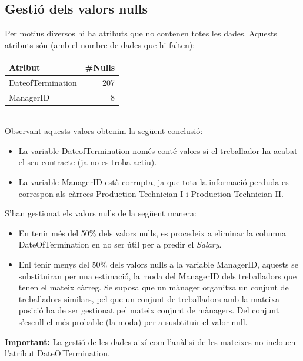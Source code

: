 \documentclass[a4paper, 11pt]{article}
\begin{document}
\subsection{Gestió dels valors nulls}
Per motius diversos hi ha atributs que no contenen totes les dades. Aquests atributs són (amb el nombre de dades que hi falten):
\begin{table}[h]
    \centering
    \begin{tabular}{l|r}
        \textbf{Atribut} & \textbf{\#Nulls}\\\hline\hline
        DateofTermination & 207  \\\hline
        ManagerID & 8 \\
    \end{tabular}
    \label{tab:my_label}
\end{table}\\
Observant aquests valors obtenim la següent conclusió:
\begin{itemize}
    \item La variable DateofTermination només conté valors si el treballador ha acabat el seu contracte (ja no es troba actiu).
    \item La variable ManagerID està corrupta, ja que tota la informació perduda es correspon als càrrecs Production Technician I i Production Technician II.
\end{itemize}
S'han gestionat els valors nulls de la següent manera:
\begin{itemize}
    \item En tenir més del 50\% dels valors nulls, es procedeix a eliminar la columna DateOfTermination en no ser útil per a predir el \textit{Salary}.
    \item Enl tenir menys del 50\% dels valors nulls a la variable ManagerID, aquests se substituiran per una estimació, la moda del ManagerID dels treballadors que tenen el mateix càrreg. Se suposa que un mànager organitza un conjunt de treballadors similars, pel que un conjunt de treballadors amb la mateixa posició ha de ser gestionat pel mateix conjunt de mànagers. Del conjunt s'escull el més probable (la moda) per a susbtituir el valor null.
\end{itemize}
\textbf{Important:} La gestió de les dades així com l'anàlisi de les mateixes no inclouen l'atribut DateOfTermination.

\newpage
\end{document}
